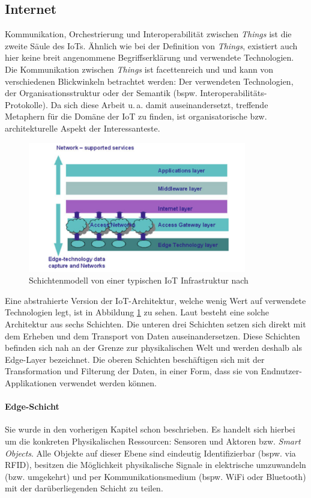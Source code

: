 \subsection{Internet}
Kommunikation, Orchestrierung und Interoperabilität zwischen \textit{Things} ist die zweite Säule des \acp{IoT}. Ähnlich wie bei der Definition von \textit{Things}, existiert auch hier keine breit angenommene Begriffserklärung und verwendete Technologien. Die Kommunikation zwischen \textit{Things} ist facettenreich und und kann von verschiedenen Blickwinkeln betrachtet werden: Der verwendeten Technologien, der Organisationsstruktur oder der Semantik (bspw. Interoperabilitäts-Protokolle). Da sich diese Arbeit u.\,a. damit auseinandersetzt, treffende Metaphern für die Domäne der \ac{IoT} zu finden, ist organisatorische bzw. architekturelle Aspekt der Interessanteste.
\begin{figure}[h]
    \centering
    \includegraphics[width=0.85\textwidth]{bilder/chapter2/iotlayers.png}
    \caption{Schichtenmodell von einer typischen \ac{IoT} Infrastruktur nach \cite{bandyopadhyay2011internet}}
    \label{fig:iotlayer}
\end{figure}
Eine abstrahierte Version der \ac{IoT}-Architektur, welche wenig Wert auf verwendete Technologien legt, ist in Abbildung \ref{fig:iotlayer} zu sehen. Laut \cite{bandyopadhyay2011internet} besteht eine solche Architektur aus sechs Schichten. Die unteren drei Schichten setzen sich direkt mit dem Erheben und dem Transport von Daten auseinandersetzen. Diese Schichten befinden sich nah an der Grenze zur physikalischen Welt und werden deshalb als Edge-Layer bezeichnet. Die oberen Schichten beschäftigen sich mit der Transformation und Filterung der Daten, in einer Form, dass sie von Endnutzer-Applikationen verwendet werden können.  

\paragraph{Edge-Schicht} Sie wurde in den vorherigen Kapitel schon beschrieben. Es handelt sich hierbei um die konkreten Physikalischen Ressourcen: Sensoren und Aktoren bzw. \textit{Smart Objects}. Alle Objekte auf dieser Ebene sind eindeutig Identifizierbar (bspw. via RFID), besitzen die Möglichkeit physikalische Signale in elektrische umzuwandeln (bzw. umgekehrt) und per Kommunikationsmedium (bspw. WiFi oder Bluetooth) mit der darüberliegenden Schicht zu teilen.


